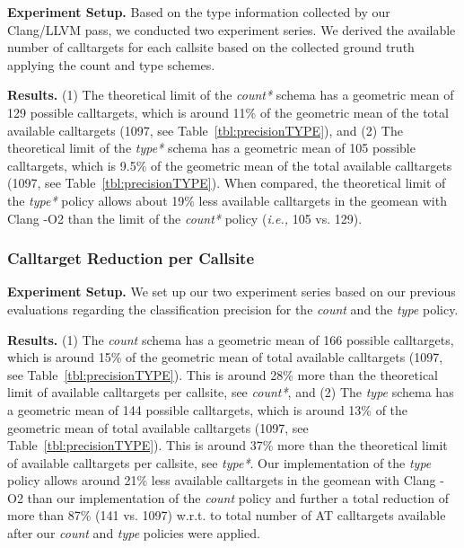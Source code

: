 \textbf{Experiment Setup.} Based on the type information collected by our Clang/LLVM pass, we conducted two experiment series.
We derived the available number of calltargets for each callsite based on the collected ground truth applying the {count} and {type} schemes.

\textbf{Results.}
(1) The theoretical limit of the \textit{count*} schema has a geometric mean of 129 possible calltargets, which is around 11\% of the geometric mean of the total available calltargets (1097, see Table~\ref{tbl:precisionTYPE}), and
(2) The theoretical limit of the \textit{type*} schema has a geometric mean of 105 possible calltargets, which is 9.5\% of the geometric mean of the total available calltargets (1097, see Table~\ref{tbl:precisionTYPE}).
When compared, the theoretical limit of the \textit{type*} policy allows about 19\% less available calltargets in the geomean with Clang -O2 than the limit of the \textit{count*} policy (\textit{i.e.,} 105 vs. 129).

\subsubsection{Calltarget Reduction per Callsite}
\label{subsection:typeshieldvslimitcount}
\textit{}

\textbf{Experiment Setup.} We set up our two experiment series based on our previous evaluations regarding the classification precision for the \textit{count} and the \textit{type} policy.

\textbf{Results.}
(1) The \textit{count} schema has a geometric mean of 166 possible calltargets, which is around 15\% of the geometric mean of total available calltargets (1097, see Table~\ref{tbl:precisionTYPE}). 
This is around 28\% more than the theoretical limit of available calltargets per callsite, see \textit{count*}, and
(2)  The \textit{type} schema has a geometric mean of 144 possible calltargets, which is around 13\% of the geometric mean of total available calltargets (1097, see Table~\ref{tbl:precisionTYPE}). 
This is around 37\% more than the theoretical limit of available calltargets per callsite, see \textit{type*}.
Our implementation of the \textit{type} policy allows around 21\% less available calltargets in the geomean with Clang -O2 than our implementation of the \textit{count} policy and 
further a total reduction of more than 87\% (141 vs. 1097) w.r.t. to total number of AT calltargets available after our \textit{count} and \textit{type} policies were applied. 


